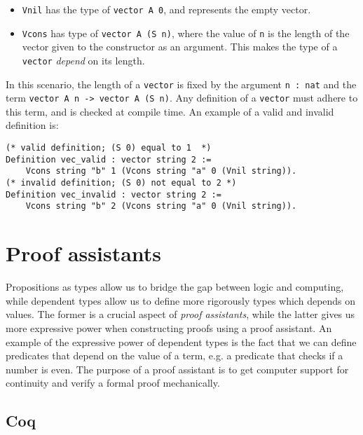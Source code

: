 \begin{itemize}
    \item
        \lstinline{Vnil} has the type of \lstinline{vector A 0}, and represents the empty vector.
    \item
        \lstinline{Vcons} has type of \lstinline{vector A (S n)}, where the value of \lstinline{n}
                            is the length of the vector given to the constructor as an argument.
                            This makes the type of a \lstinline{vector} \textit{depend} on its length.
\end{itemize}

In this scenario, the length of a \lstinline{vector} is fixed by the argument \lstinline{n : nat}
and the term \lstinline{vector A n -> vector A (S n)}.
Any definition of a \lstinline{vector} must adhere to this term, and is checked at compile time.
An example of a valid and invalid definition is:

\begin{minipage}{\linewidth}
\begin{lstlisting}[language=Coq, label={lst:dep_type_vec_ex}, caption={Examples of vectors in Coq}]
(* valid definition; (S 0) equal to 1  *)
Definition vec_valid : vector string 2 :=
    Vcons string "b" 1 (Vcons string "a" 0 (Vnil string)).
(* invalid definition; (S 0) not equal to 2 *)
Definition vec_invalid : vector string 2 :=
    Vcons string "b" 2 (Vcons string "a" 0 (Vnil string)).
\end{lstlisting}
\end{minipage}

\section{Proof assistants}

Propositions as types allow us to bridge the gap between logic and computing,
while dependent types allow us to define more rigorously types which depends on values.
The former is a crucial aspect of \textit{proof assistants}, while the latter gives
us more expressive power when constructing proofs using a proof assistant.
An example of the expressive power of dependent types is the fact that we can define
predicates that depend on the value of a term, e.g. a predicate that checks if a number is even.
The purpose of a proof assistant is to get computer support for continuity and verify a formal proof mechanically.

\subsection{Coq}


